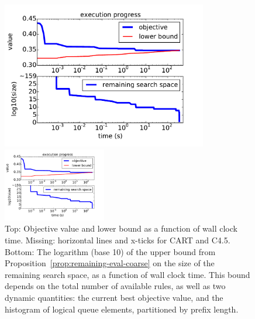 \begin{figure}[t!]
\begin{center}
\begin{arxiv}
\includegraphics[width=0.8\textwidth]{figs/ela_compas-remaining-space.pdf}
\end{arxiv}
\begin{kdd}
\includegraphics[width=0.4\textwidth]{figs/ela_compas-remaining-space.pdf}
\end{kdd}
\end{center}
\caption{Top: Objective value and lower bound as a function of wall clock time.
%
Missing: horizontal lines and x-ticks for CART and C4.5.
%
Bottom:
The logarithm (base 10) of the upper bound
from Proposition~\ref{prop:remaining-eval-coarse}
on the size of the remaining search space,
as a function of wall clock time.
%
This bound depends on the total number of available rules,
as well as two dynamic quantities:
the current best objective value,
and the histogram of logical queue elements,
partitioned by prefix length.}
\label{fig:objective}
\end{figure}


